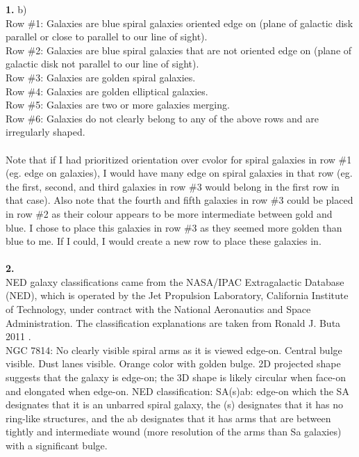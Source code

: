 \documentclass[10pt,letterpaper]{article}
\begin{document}
\textbf{1.} b)\\ 
Row \#1: Galaxies are blue spiral galaxies oriented edge on (plane of galactic disk parallel or close to parallel to our line of sight).\\
Row \#2: Galaxies are blue spiral galaxies that are not oriented edge on (plane of galactic disk not parallel to our line of sight).\\
Row \#3: Galaxies are golden spiral galaxies.\\
Row \#4: Galaxies are golden elliptical galaxies.\\
Row \#5: Galaxies are two or more galaxies merging.\\
Row \#6: Galaxies do not clearly belong to any of the above rows and are irregularly shaped.\\
\\
Note that if I had prioritized orientation over cvolor for spiral galaxies in row \#1 (eg. edge on galaxies), I would have many edge on spiral galaxies in that row  (eg. the first, second, and third galaxies in row \#3 would belong in the first row in that case). Also note that the fourth and fifth galaxies in row \#3 could be placed in row \#2 as their colour appears to be more intermediate between gold and blue. I chose to place this galaxies in row \#3 as they seemed more golden than blue to me. If I could, I would create a new row to place these galaxies in.\\
\\
\textbf{2.}\\
NED galaxy classifications came from the NASA/IPAC Extragalactic Database (NED), which is operated by the Jet Propulsion Laboratory, California Institute of Technology, under contract with the National Aeronautics and Space Administration. The classification explanations are taken from Ronald J. Buta 2011 \cite{galaxy morphology}.\\

NGC 7814: No clearly visible spiral arms as it is viewed edge-on. Central bulge visible. Dust lanes visible. Orange color with golden bulge. 2D projected shape suggests that the galaxy is edge-on; the 3D shape is likely circular when face-on and elongated when edge-on. NED classification: SA(s)ab: edge-on which the SA designates that it is an unbarred spiral galaxy, the (s) designates that it has no ring-like structures, and the ab designates that it has arms that are between tightly and intermediate wound (more resolution of the arms than Sa galaxies) with a significant bulge.\\
\end{document}
